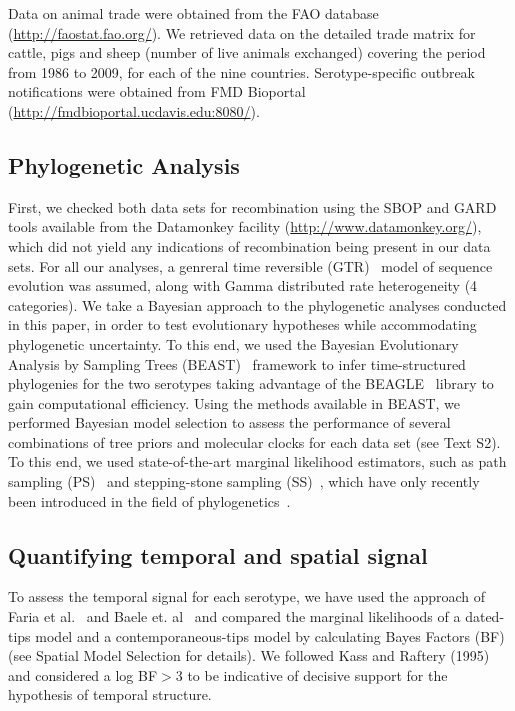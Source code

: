 \documentclass[10pt]{article}
\begin{document}
Data on animal trade were obtained from the FAO database (\url{http://faostat.fao.org/}).
We retrieved data on the detailed trade matrix for cattle, pigs and sheep (number of live animals exchanged) covering the period from 1986 to 2009, for each of the nine countries.
Serotype-specific outbreak notifications were obtained from FMD Bioportal (\url{http://fmdbioportal.ucdavis.edu:8080/}).

\subsection*{Phylogenetic Analysis}

First, we checked both data sets for recombination using the SBOP and GARD~\cite{sbpgard} tools available from the Datamonkey facility (\url{http://www.datamonkey.org/}), which did not yield any indications of recombination being present in our data sets.
For all our analyses, a genreral time reversible (GTR)~\cite{Tavare1986} model of sequence evolution was assumed, along with Gamma distributed rate heterogeneity (4 categories).
We take a Bayesian approach to the phylogenetic analyses conducted in this paper, in order to test evolutionary hypotheses while accommodating phylogenetic uncertainty. 
To this end, we used the Bayesian Evolutionary Analysis by Sampling Trees (BEAST)~\cite{beast2012} framework to infer time-structured phylogenies for the two serotypes taking advantage of the  BEAGLE~\cite{BEAGLE} library to gain computational efficiency.
Using the methods available in BEAST, we performed Bayesian model selection to assess the performance of several combinations of tree priors and molecular clocks for each data set (see Text S2).
To this end, we used state-of-the-art marginal likelihood estimators, such as path sampling (PS)~\cite{LartillotPhilippe} and stepping-stone sampling (SS)~\cite{Xie}, which have only recently been introduced in the field of phylogenetics~\cite{LartillotPhilippe, Xie, Baele2012, Baele2013a, Baele2013b, Baele2013c}.

\subsection*{Quantifying temporal and spatial signal} 

To assess the temporal signal for each serotype, we have used the approach of Faria et al.~\cite{Faria2012} and Baele et. al~\cite{Baele2012} and compared the marginal likelihoods of a dated-tips model and a contemporaneous-tips model by calculating Bayes Factors (BF)~\cite{Suchard2001, suchard2005models} (see Spatial Model Selection for details).
We followed Kass and Raftery (1995)~\cite{KassRaftery1995} and considered a log BF$>$3 to be indicative of decisive support for the hypothesis of temporal structure.
\end{document}
